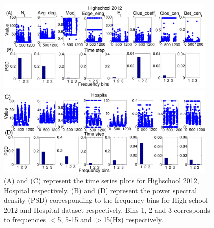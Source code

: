  \begin{figure}[!ht]
  
    \centering
  \includegraphics*[width=0.95\textwidth,angle=0]{./texfiles/Chapter_1/fig/highschool_psd-eps-converted-to.pdf}
  
  \centering
  \includegraphics*[width=0.95\textwidth,angle=0]{./texfiles/Chapter_1/fig/hospital_psd-eps-converted-to.pdf}
  
  \caption{\label{fig_all_dataset_1} (A) and (C) represent the time series plots for Highschool 2012, Hospital respectively. (B) and (D) represent the power spectral density (PSD) corresponding to the frequency bins for High-school 2012 and Hospital dataset respectively. Bins 1, 2 and 3 corresponds to frequencies $<$5, 5-15 and $>$15(Hz) respectively.}
  
  \end{figure}
% 
%  
